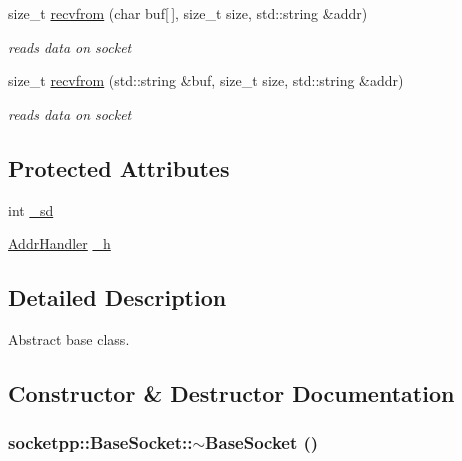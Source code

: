 \begin{CompactItemize}
size\_\-t \hyperlink{classsocketpp_1_1BaseSocket_c7a79cd90b082806dcafb14fbbd130b8}{recvfrom} (char buf\mbox{[}$\,$\mbox{]}, size\_\-t size, std::string \&addr)
\begin{CompactList}\small\item\em reads data on socket \item\end{CompactList}\item 
size\_\-t \hyperlink{classsocketpp_1_1BaseSocket_ace82407e13a6eee26aa1f5f642d0cfc}{recvfrom} (std::string \&buf, size\_\-t size, std::string \&addr)
\begin{CompactList}\small\item\em reads data on socket \item\end{CompactList}\end{CompactItemize}
\subsection*{Protected Attributes}
\begin{CompactItemize}
\item 
int \hyperlink{classsocketpp_1_1BaseSocket_a5ef6b5fabb3988bced6a23d9631985d}{\_\-sd}
\item 
\hyperlink{classsocketpp_1_1AddrHandler}{AddrHandler} \hyperlink{classsocketpp_1_1BaseSocket_1e44e3c6c2ecd89c2aa716cc62528620}{\_\-h}
\end{CompactItemize}


\subsection{Detailed Description}
Abstract base class. 

\subsection{Constructor \& Destructor Documentation}
\hypertarget{classsocketpp_1_1BaseSocket_2e066addfaa6f5648e68b3e6b0a15e79}{
\subsubsection[{$\sim$BaseSocket}]{\setlength{\rightskip}{0pt plus 5cm}socketpp::BaseSocket::$\sim$BaseSocket ()}}
\label{classsocketpp_1_1BaseSocket_2e066addfaa6f5648e68b3e6b0a15e79}


